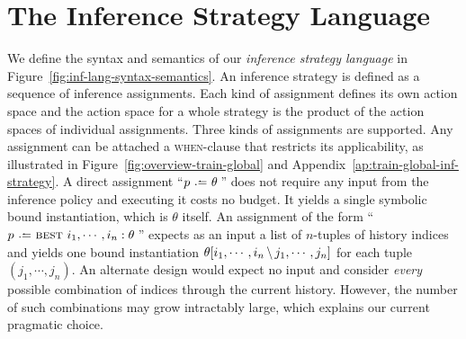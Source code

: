 \documentclass[acmsmall,screen,nonacm]{acmart}
\begin{document}
\section{The Inference Strategy Language}\label{sec:inference-strategy-language}


We define the syntax and semantics of our \emph{inference strategy language} in Figure~\ref{fig:inf-lang-syntax-semantics}. An inference strategy is defined as a sequence of inference assignments. Each kind of assignment defines its own action space and the action space for a whole strategy is the product of the action spaces of individual assignments.  Three kinds of assignments are supported.
Any assignment can be attached a \textsc{when}-clause that restricts its applicability, as illustrated in Figure~\ref{fig:overview-train-global} and Appendix~\ref{ap:train-global-inf-strategy}.
A direct assignment ``$p \slassign \theta$\,'' does not require any input from the inference policy and executing it costs no budget. It yields a single symbolic bound instantiation, which is $\theta$ itself. An assignment of the form ``$p \slassign \slbest i_1, \cdots, i_n : \theta$\,'' expects as an input a list of $n$-tuples of history indices and yields one bound instantiation ${\theta}[i_1, \cdots, i_n\, \backslash \,j_1, \cdots, j_n]$ for each tuple $(j_1, \cdots, j_n)$. An alternate design would expect no input and consider \emph{every} possible combination of indices through the current history. However, the number of such combinations may grow intractably large, which explains our current pragmatic choice. %
\end{document}
